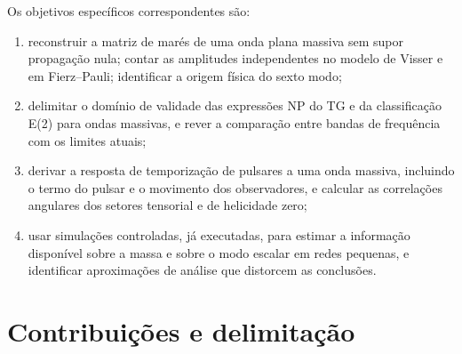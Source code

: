 Os objetivos específicos correspondentes são:
\begin{enumerate}
 \item reconstruir a matriz de marés de uma onda plana massiva sem supor
 propagação nula; contar as amplitudes independentes no modelo de Visser
 e em Fierz--Pauli; identificar a origem física do sexto modo;
 \item delimitar o domínio de validade das expressões NP do TG e da
 classificação E(2) para ondas massivas, e rever a comparação entre
 bandas de frequência com os limites atuais;
 \item derivar a resposta de temporização de pulsares a uma onda massiva,
 incluindo o termo do pulsar e o movimento dos observadores, e calcular
 as correlações angulares dos setores tensorial e de helicidade zero;
 \item usar simulações controladas, já executadas, para estimar a
 informação disponível sobre a massa e sobre o modo escalar em redes
 pequenas, e identificar aproximações de análise que distorcem as
 conclusões.
\end{enumerate}

\section{Contribuições e delimitação}

